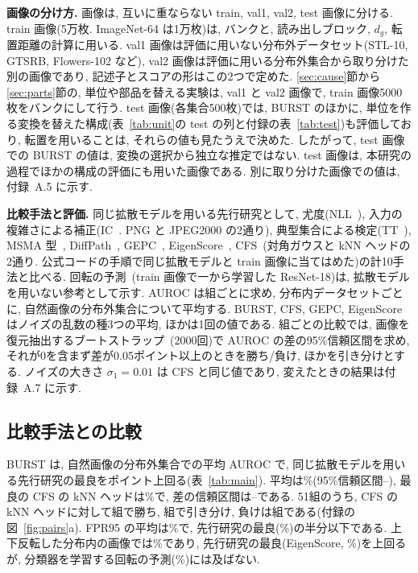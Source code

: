 \documentclass[MIRU,submit]{miru2025j}
\newcommand{\method}{BURST}                 %
\begin{document}
\textbf{画像の分け方.} 画像は, 互いに重ならない train, val1, val2, test 画像に分ける. train 画像(5万枚. ImageNet-64 は1万枚)は, バンクと, 読み出しブロック, $d_g$, 転置距離の計算に用いる. val1 画像は評価に用いない分布外データセット(STL-10, GTSRB, Flowers-102 など), val2 画像は評価に用いる分布外集合から取り分けた別の画像であり, 記述子とスコアの形はこの2つで定めた. \ref{sec:cause}節から\ref{sec:parts}節の, 単位や部品を替える実験は, val1 と val2 画像で, train 画像5000枚をバンクにして行う. test 画像(各集合500枚)では, \method{} のほかに, 単位を作る変換を替えた構成(表~\ref{tab:unit}の test の列と付録の表~\ref{tab:test})も評価しており, 転置を用いることは, それらの値も見たうえで決めた. したがって, test 画像での \method{} の値は, 変換の選択から独立な推定ではない. test 画像は, 本研究の過程でほかの構成の評価にも用いた画像である. 別に取り分けた画像での値は, 付録~A.5 に示す.

\textbf{比較手法と評価.} 同じ拡散モデルを用いる先行研究として, 尤度(NLL~\cite{song2021score}), 入力の複雑さによる補正(IC~\cite{serra2020input}. PNG と JPEG2000 の2通り), 典型集合による検定(TT~\cite{nalisnick2019typ}), MSMA 型~\cite{mahmood2021msma}, DiffPath~\cite{heng2024diffpath}, GEPC~\cite{alexis2026gepc}, EigenScore~\cite{shoushtari2026eigenscore}, CFS~\cite{rouzoumka2026cfs}(対角ガウスと kNN ヘッドの2通り. 公式コードの手順で同じ拡散モデルと train 画像に当てはめた)の計10手法と比べる. 回転の予測~\cite{hendrycks2019ss}(train 画像で一から学習した ResNet-18)は, 拡散モデルを用いない参考として示す. AUROC は組ごとに求め, 分布内データセットごとに, 自然画像の分布外集合について平均する. \method{}, CFS, GEPC, EigenScore はノイズの乱数の種3つの平均, ほかは1回の値である. 組ごとの比較では, 画像を復元抽出するブートストラップ~\cite{efron1979bootstrap}(2000回)で AUROC の差の95\%信頼区間を求め, それが0を含まず差が0.05ポイント以上のときを勝ち/負け, ほかを引き分けとする. ノイズの大きさ $\sigma_1=0.01$ は CFS と同じ値であり, 変えたときの結果は付録~A.7 に示す.

\subsection{比較手法との比較}
\label{sec:main}
\method{} は, 自然画像の分布外集合での平均 AUROC で, 同じ拡散モデルを用いる先行研究の最良を\nGapPriorT{}ポイント上回る(表~\ref{tab:main}). 平均は\nOursT\%(95\%信頼区間\nOursLoT--\nOursHiT), 最良の CFS の kNN ヘッドは\nPriorT\%で, 差の信頼区間は\nGapPriorLoT--\nGapPriorHiT{}である. 51組のうち, CFS の kNN ヘッドに対して\nPriorWinT{}組で勝ち, \nPriorTieT{}組で引き分け, 負けは\nPriorLossT{}組である(付録の図~\ref{fig:pairs}a). FPR95 の平均は\nFprT\%で, 先行研究の最良(\nPriorFprBestT\%)の半分以下である. 上下反転した分布内の画像では\nUdT\%であり, 先行研究の最良(EigenScore, \nEigenUdT\%)を上回るが, 分類器を学習する回転の予測(\nRotUdT\%)には及ばない.
\end{document}
